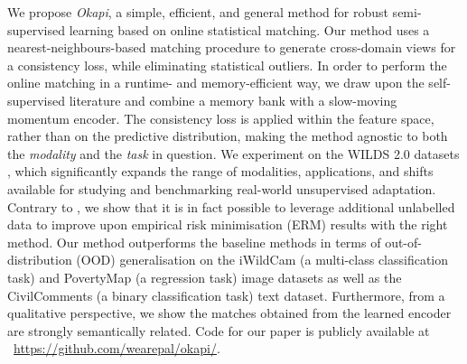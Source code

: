 We propose \emph{Okapi}, a simple, efficient, and general method for robust semi-supervised
learning based on online statistical matching. 
%
Our method uses a nearest-neighbours-based matching procedure to generate cross-domain views for a
consistency loss, while eliminating statistical outliers.
%
In order to perform the online matching in a runtime- and memory-efficient way, we draw upon the
self-supervised literature and combine a memory bank with a slow-moving momentum encoder.
%
The consistency loss is applied within the feature space, rather than on the predictive
distribution, making the method agnostic to both the \emph{modality} and the \emph{task} in
question.
% 
We experiment on the WILDS 2.0 datasets \citep{SagWeiLeeGaoetal22}, which significantly expands the
range of modalities, applications, and shifts available for studying and benchmarking real-world
unsupervised adaptation. 
%
Contrary to \cite{SagWeiLeeGaoetal22}, we show that it is in fact possible to leverage additional
unlabelled data to improve upon empirical risk minimisation (ERM) results with the right method.
%
Our method outperforms the baseline methods in terms of out-of-distribution (OOD) generalisation on
the iWildCam (a multi-class classification task) and PovertyMap (a regression task) image datasets
as well as the CivilComments (a binary classification task) text dataset.
%
Furthermore, from a qualitative perspective, we show the matches obtained from the learned
encoder are strongly semantically related. 
%
Code for our paper is publicly available at ~\url{https://github.com/wearepal/okapi/}.
